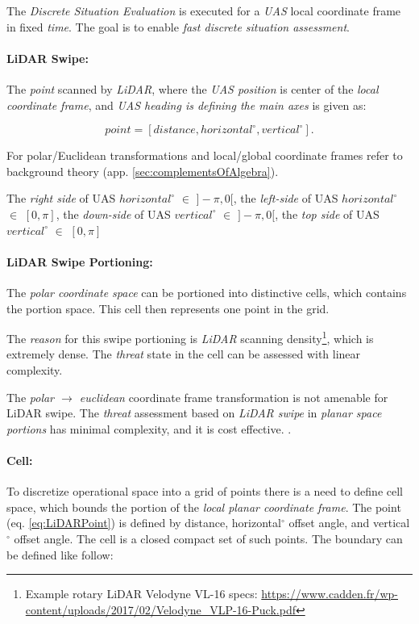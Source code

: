 The \emph{Discrete Situation Evaluation} is executed for a \emph{UAS} local coordinate frame in fixed \emph{time}.  The goal is to enable \emph{fast discrete situation assessment}. 


\paragraph{LiDAR Swipe:} The \emph{point} scanned by \emph{LiDAR}, where the \emph{UAS position} is center of the \emph{local coordinate frame}, and \emph{UAS heading is defining the main axes} is given as:

\begin{equation}\label{eq:LiDARPoint}
    point = [distance,horizontal^\circ,vertical^\circ].
\end{equation}

\begin{note}
    For polar/Euclidean transformations and local/global coordinate frames refer to background theory (app. \ref{sec:complementsOfAlgebra}). 
    
    The \emph{right side} of UAS $horizontal^\circ$ $\in$ $]-\pi,0[$, the \emph{left-side} of UAS $horizontal^\circ$ $\in$ $[0,\pi]$, the \emph{down-side} of UAS $vertical^\circ$ $\in$ $]-\pi,0[$, the \emph{top side} of UAS $vertical^\circ$ $\in$ $[0,\pi]$
\end{note}

\paragraph{LiDAR Swipe Portioning:} The \emph{polar coordinate space} can be portioned into distinctive cells, which contains the portion space. This cell then represents one point in the grid.

The \emph{reason} for this swipe portioning is \emph{LiDAR} scanning density\footnote{Example rotary LiDAR Velodyne VL-16 specs: \url{https://www.cadden.fr/wp-content/uploads/2017/02/Velodyne_VLP-16-Puck.pdf}}, which is extremely dense. The \emph{threat} state in the cell can be assessed with linear complexity. 

The \emph{polar $\to$ euclidean} coordinate frame transformation is not amenable  for LiDAR swipe. The \emph{threat} assessment based on \emph{LiDAR swipe} in \emph{planar space portions} has minimal complexity, and it is cost effective. \cite{gupta2010comparative}.


\paragraph{Cell:} To discretize operational space into a grid of points there is a need to define cell space, which bounds the portion of the \emph{local planar coordinate frame}. The point (eq. \ref{eq:LiDARPoint}) is defined by distance, horizontal$^\circ$ offset angle, and vertical$^\circ$ offset angle. The cell is a closed compact set of such points. The boundary can be defined like follow: 

